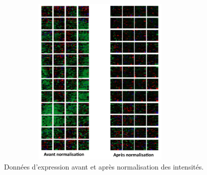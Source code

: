 \documentclass[11pt,a4paper,notrimn]{krantz}
\theoremstyle{definition}
\theoremstyle{definition}
\theoremstyle{remark}
\begin{document}
\begin{figure}[!htb]

{\centering \includegraphics[width=4in,height=3.25in]{FiguresTables/normalisation} 

}

\caption{Données d'expression avant et après normalisation
des intensités.}\label{fig:normalisation}
\end{figure}
\end{document}
